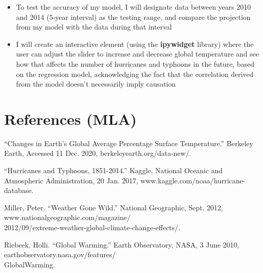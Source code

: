 \documentclass[fontsize=11pt]{article}
\begin{document}
\begin{itemize}
    \item To test the accuracy of my model, I will designate data between years 2010 and 2014 (5-year interval) as the testing range, and compare the projection from my model with the data during that interval
    
    \item I will create an interactive element (using the \textbf{ipywidget} library) where the user can adjust the slider to increase and decrease global temperature and see how that affects the number of hurricanes and typhoons in the future, based on the regression model, acknowledging the fact that the correlation derived from the model doesn't necessarily imply causation
\end{itemize}
\section*{References (MLA)}

\begin{hangparas}{0.5in}{1}

“Changes in Earth's Global Average Percentage Surface Temperature.” Berkeley Earth, Accessed 11 Dec. 2020, berkeleyearth.org/data-new/. 

\bigskip

“Hurricanes and Typhoons, 1851-2014.” Kaggle, National Oceanic and Atmospheric Administration, 20 Jan. 2017, www.kaggle.com/noaa/hurricane-database. 

\bigskip

Miller, Peter. “Weather Gone Wild.” National Geographic, Sept. 2012, www.nationalgeographic.com/magazine/\\2012/09/extreme-weather-global-climate-change-effects/. 

\bigskip

Riebeek, Holli. “Global Warming.” Earth Observatory, NASA, 3 June 2010, earthobservatory.nasa.gov/features/\\GlobalWarming. 

\end{hangparas}
\end{document}

